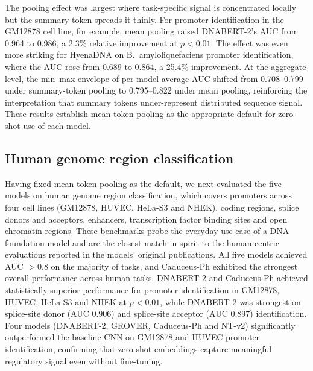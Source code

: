\documentclass[11pt,a4paper]{article}
\begin{document}
The pooling effect was largest where task-specific signal is concentrated locally but the summary token spreads it thinly. For promoter identification in the GM12878 cell line, for example, mean pooling raised DNABERT-2's AUC from 0.964 to 0.986, a 2.3\% relative improvement at $p < 0.01$. The effect was even more striking for HyenaDNA on B.~amyloliquefaciens promoter identification, where the AUC rose from 0.689 to 0.864, a 25.4\% improvement. At the aggregate level, the min--max envelope of per-model average AUC shifted from 0.708--0.799 under summary-token pooling to 0.795--0.822 under mean pooling, reinforcing the interpretation that summary tokens under-represent distributed sequence signal. These results establish mean token pooling as the appropriate default for zero-shot use of each model.

\subsection{Human genome region classification}
Having fixed mean token pooling as the default, we next evaluated the five models on human genome region classification, which covers promoters across four cell lines (GM12878, HUVEC, HeLa-S3 and NHEK), coding regions, splice donors and acceptors, enhancers, transcription factor binding sites and open chromatin regions. These benchmarks probe the everyday use case of a DNA foundation model and are the closest match in spirit to the human-centric evaluations reported in the models' original publications. All five models achieved AUC $> 0.8$ on the majority of tasks, and Caduceus-Ph exhibited the strongest overall performance across human tasks. DNABERT-2 and Caduceus-Ph achieved statistically superior performance for promoter identification in GM12878, HUVEC, HeLa-S3 and NHEK at $p < 0.01$, while DNABERT-2 was strongest on splice-site donor (AUC 0.906) and splice-site acceptor (AUC 0.897) identification. Four models (DNABERT-2, GROVER, Caduceus-Ph and NT-v2) significantly outperformed the baseline CNN on GM12878 and HUVEC promoter identification, confirming that zero-shot embeddings capture meaningful regulatory signal even without fine-tuning.
\end{document}
